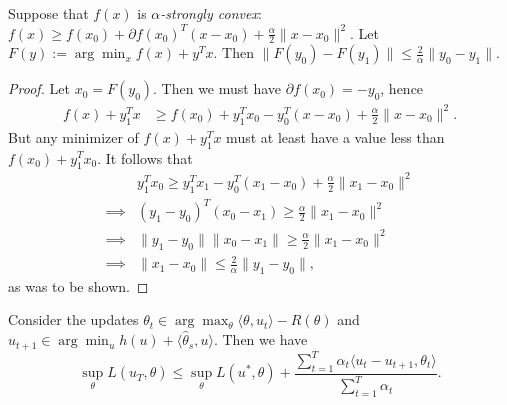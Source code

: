\documentclass{article}
\begin{document}
\begin{lemma}
\label{lem:convexity}
Suppose that $f(x)$ is \emph{$\alpha$-strongly convex}: $f(x) \geq f(x_0) + \partial f(x_0)^T(x-x_0) + \frac{\alpha}{2}\|x-x_0\|^2$. 
Let $F(y) := \arg\min_x f(x) + y^Tx$. Then $\|F(y_0)-F(y_1)\| \leq \frac{2}{\alpha} \|y_0-y_1\|$.
\end{lemma}
\begin{proof}
Let $x_0 = F(y_0)$. Then we must have $\partial f(x_0) = -y_0$, hence 
\begin{align*}
f(x)+y_1^Tx &\geq f(x_0) + y_1^Tx_0 - y_0^T(x-x_0) + \frac{\alpha}{2}\|x-x_0\|^2.
\end{align*}
But any minimizer of $f(x) + y_1^Tx$ must at least have a value less than $f(x_0) + y_1^Tx_0$. 
It follows that 
\begin{align*}
         & y_1^Tx_0 \geq y_1^Tx_1 - y_0^T(x_1-x_0) + \frac{\alpha}{2}\|x_1-x_0\|^2 \\
\implies & (y_1-y_0)^T(x_0-x_1) \geq \frac{\alpha}{2}\|x_1-x_0\|^2 \\
\implies & \|y_1-y_0\|\|x_0-x_1\| \geq \frac{\alpha}{2}\|x_1-x_0\|^2 \\
\implies & \|x_1-x_0\| \leq \frac{2}{\alpha} \|y_1-y_0\|,
\end{align*}
as was to be shown.
\end{proof}
\begin{proposition}
\label{prop:method-1}
Consider the updates $\theta_t \in \arg\max_{\theta} \langle \theta, u_t \rangle - R(\theta)$ 
and $u_{t+1} \in \arg\min_u h(u) + \langle \hat{\theta}_s, u \rangle$. 
Then we have
\[ \sup_{\theta} L(\hat{u}_T, \theta) \leq \sup_{\theta} L(u^*, \theta) + \frac{\sum_{t=1}^T \alpha_t \langle u_t - u_{t+1}, \theta_t \rangle}{\sum_{t=1}^T \alpha_t}. \]
\end{proposition}
\end{document}
